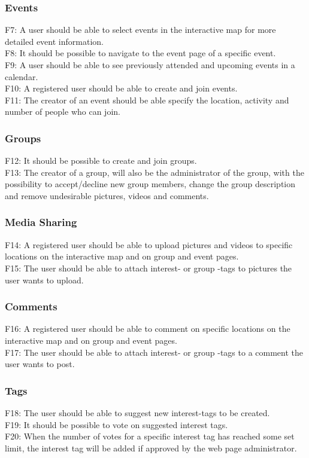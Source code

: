 \subsubsection{Events}
F7: A user should be able to select events in the interactive map for more detailed event information. \\
F8: It should be possible to navigate to the event page of a specific event.\\
F9: A user should be able to see previously attended and upcoming events in a calendar.\\
F10: A registered user should be able to create and join events.\\
F11: The creator of an event should be able specify the location, activity and number of people who can join.

\subsubsection{Groups}
F12: It should be possible to create and join groups.\\
F13: The creator of a group, will also be the administrator of the group, with the possibility to accept/decline new group members, change the group description and remove undesirable pictures, videos and comments.

\subsubsection{Media Sharing}
F14: A registered user should be able to upload pictures and videos to specific locations on the interactive map and on group and event pages.\\
F15: The user should be able to attach interest- or group -tags to pictures the user wants to upload.

\subsubsection{Comments}
F16: A registered user should be able to comment on specific locations on the interactive map and on group and event pages. \\
F17: The user should be able to attach interest- or group -tags to a comment the user wants to post.

\subsubsection{Tags}
F18: The user should be able to suggest new interest-tags to be created.\\
F19: It should be possible to vote on suggested interest tags.\\
F20: When the number of votes for a specific interest tag has reached some set limit, the interest tag will be added if approved by the web page administrator.

